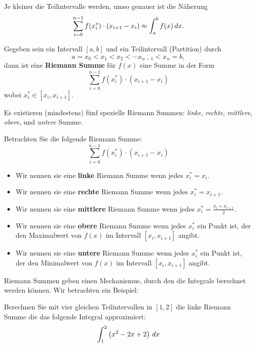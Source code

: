 \begin{marginfigure}
\caption{Je kleiner die Teilintervalle werden, umso genauer ist die Näherung
\[
\sum_{i=0}^{n-1} f(x_i^*) \cdot (x_{i+1}-x_i) \approx \int_a^b f(x) \, d x.
\]}
\label{figure:partitionsfiner}
\end{marginfigure}


\begin{definition}
Gegeben sein ein Intervall $[a,b]$ und ein Teilintervall (Partition) durch
\[
a = x_0 < x_1 <x_2 < \cdots x_{n-1}< x_n = b,
\]
dann ist eine \textbf{Riemann Summe} für $f(x)$ eine Summe in der Form
\[
\sum_{i=0}^{n-1} f(x_i^*) \cdot (x_{i+1}-x_i)
\]
wobei $x_i^*\in [x_i,x_{i+1}]$.
\end{definition}

Es existieren (mindestens) fünf spezielle Riemann Summen: \textit{linke},
\textit{rechte}, \textit{mittlere}, \textit{obere}, und \textit{untere} Summe.

\begin{definition}
Betrachten Sie die folgende Riemann Summe:
\[
\sum_{i=0}^{n-1} f(x_i^*) \cdot (x_{i+1}-x_i)
\]
\begin{itemize}
\item Wir nennen sie eine \textbf{linke} Riemann Summe wenn jedes $x_i^* =
  x_i$.
\item Wir nennen sie eine \textbf{rechte} Riemann Summe wenn jedes $x_i^* =
  x_{i+1}$.
\item Wir nennen sie eine \textbf{mittlere} Riemann Summe wenn jedes $x_i^*
  = \frac{x_i+x_{i+1}}{2}$.
\item Wir nennen sie eine \textbf{obere} Riemann Summe wenn jedes $x_i^*$ ein Punkt ist,
  der den Maximalwert von $f(x)$ im Intervall $[x_i,x_{i+1}]$ angibt.
\item Wir nennen sie eine \textbf{untere} Riemann Summe wenn jedes $x_i^*$ ein Punkt ist,
  der den Minimalwert von $f(x)$ im Intervall $[x_i,x_{i+1}]$ angibt.
\end{itemize}
\end{definition}
Riemann Summen geben einen Mechanismus, durch den die Integrale berechnet werden können. Wir betrachten ein Beispiel:

\begin{example}
Berechnen Sie mit vier gleichen Teilintervallen in $[1,2]$ die linke Riemann Summe die das folgende Integral approximiert:
\[
\int_1^2 \left(x^2-2x+2\right)\, d x
\]

\end{example}

